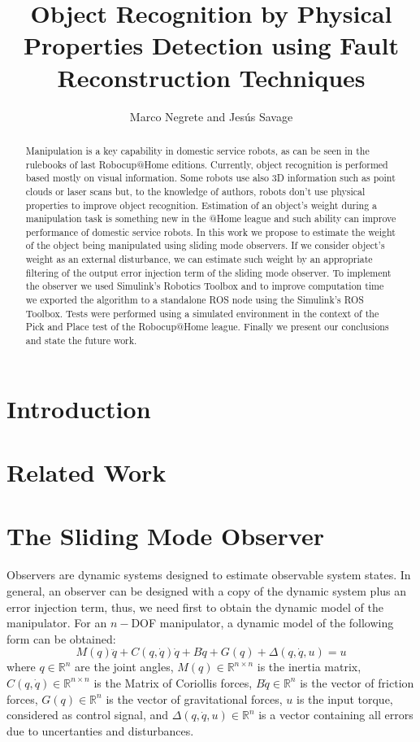 \documentclass[a4paper, 10pt]{article}
\title{Object Recognition by Physical Properties Detection using Fault Reconstruction Techniques}
\author{Marco Negrete and Jesús Savage}
\begin{document}
\maketitle
\begin{abstract}
  Manipulation is a key capability in domestic service robots, as can be seen in the rulebooks of last Robocup@Home editions. Currently, object recognition is performed based mostly on visual information. Some robots use also 3D information such as point clouds or laser scans but, to the knowledge of authors, robots don't use physical properties to improve object recognition. Estimation of an object's weight during a manipulation task is something new in the @Home league and such ability can improve performance of domestic service robots. In this work we propose to estimate the weight of the object being manipulated using sliding mode observers. If we consider object's weight as an external disturbance, we can estimate such weight by an appropriate filtering of the output error injection term of the sliding mode observer. To implement the observer we used Simulink's Robotics Toolbox and to improve computation time we exported the algorithm to a standalone ROS node using the Simulink's ROS Toolbox. Tests were performed using a simulated environment in the context of the Pick and Place test of the Robocup@Home league. Finally we present our conclusions and state the future work. 
\end{abstract}

\section{Introduction}

\section{Related Work}

\section{The Sliding Mode Observer}
Observers are dynamic systems designed to estimate observable system states. In general, an observer can be designed with a copy of the dynamic system plus an error injection term, thus, we need first to obtain the dynamic model of the manipulator. For an $n-$DOF manipulator, a dynamic model of the following form can be obtained:
\begin{equation}
    M(q)\ddot{q} + C(q, \dot{q})\dot{q} + B\dot{q} + G(q) + \Delta(q,\dot{q}, u) = u
    \label{eq:lagrangian}
\end{equation}
where $q\in \mathbb{R}^n$ are the joint angles, $M(q)\in \mathbb{R}^{n\times n}$ is the inertia matrix, $C(q,\dot{q})\in \mathbb{R}^{n\times n}$ is the Matrix of Coriollis forces, $B\dot{q}\in \mathbb{R}^n$ is the vector of friction forces, $G(q)\in\mathbb{R}^n$ is the vector of gravitational forces, $u$ is the input torque, considered as control signal, and $\Delta(q,\dot{q},u)\in\mathbb{R}^n$ is a vector containing all errors due to uncertanties and disturbances.
\end{document}
